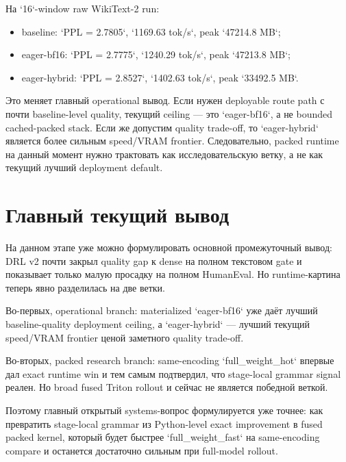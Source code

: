 На `16`-window raw WikiText-2 run:

\begin{itemize}[leftmargin=1.5em]
\item baseline: `PPL = 2.7805`, `1169.63 tok/s`, peak `47214.8 MB`;
\item eager-bf16: `PPL = 2.7775`, `1240.29 tok/s`, peak `47213.8 MB`;
\item eager-hybrid: `PPL = 2.8527`, `1402.63 tok/s`, peak `33492.5 MB`.
\end{itemize}

Это меняет главный operational вывод. Если нужен deployable route path с почти
baseline-level quality, текущий ceiling --- это `eager-bf16`, а не bounded
cached-packed stack. Если же допустим quality trade-off, то `eager-hybrid`
является более сильным speed/VRAM frontier. Следовательно, packed runtime на
данный момент нужно трактовать как исследовательскую ветку, а не как текущий
лучший deployment default.

\section{Главный текущий вывод}

На данном этапе уже можно формулировать основной промежуточный вывод:
DRL v2 почти закрыл quality gap к dense на полном текстовом gate и показывает
только малую просадку на полном HumanEval. Но runtime-картина теперь явно
разделилась на две ветки.

Во-первых, operational branch: materialized `eager-bf16` уже даёт лучший
baseline-quality deployment ceiling, а `eager-hybrid` --- лучший текущий
speed/VRAM frontier ценой заметного quality trade-off.

Во-вторых, packed research branch: same-encoding `full_weight_hot` впервые дал
exact runtime win и тем самым подтвердил, что stage-local grammar signal реален.
Но broad fused Triton rollout и сейчас не является победной веткой.

Поэтому главный открытый systems-вопрос формулируется уже точнее: как превратить
stage-local grammar из Python-level exact improvement в fused packed kernel,
который будет быстрее `full_weight_fast` на same-encoding compare и останется
достаточно сильным при full-model rollout.